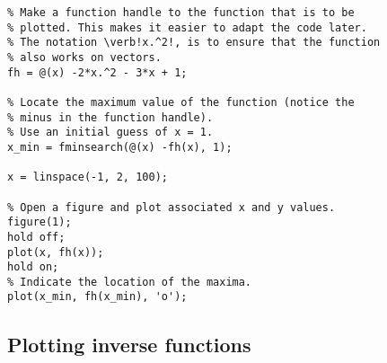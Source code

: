 %
%
%
%
%
%
%
%
%
%
%
%
%
%

\begin{lstlisting}
% Make a function handle to the function that is to be
% plotted. This makes it easier to adapt the code later.
% The notation \verb!x.^2!, is to ensure that the function
% also works on vectors.
fh = @(x) -2*x.^2 - 3*x + 1;

% Locate the maximum value of the function (notice the
% minus in the function handle). 
% Use an initial guess of x = 1.
x_min = fminsearch(@(x) -fh(x), 1);

x = linspace(-1, 2, 100);

% Open a figure and plot associated x and y values.
figure(1);
hold off;
plot(x, fh(x));
hold on;
% Indicate the location of the maxima.
plot(x_min, fh(x_min), 'o');
\end{lstlisting}


%
%
%
%
%
%



\subsection{Plotting inverse functions}

